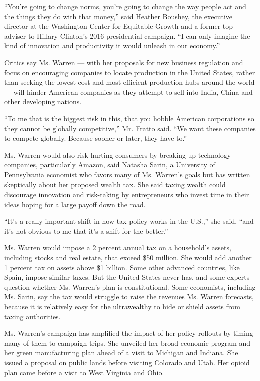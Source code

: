 ``You're going to change norms, you're going to change the way people
act and the things they do with that money,'' said Heather Boushey, the
executive director at the Washington Center for Equitable Growth and a
former top adviser to Hillary Clinton's 2016 presidential campaign. ``I
can only imagine the kind of innovation and productivity it would
unleash in our economy.''

Critics say Ms. Warren --- with her proposals for new business
regulation and focus on encouraging companies to locate production in
the United States, rather than seeking the lowest-cost and most
efficient production hubs around the world --- will hinder American
companies as they attempt to sell into India, China and other developing
nations.

``To me that is the biggest risk in this, that you hobble American
corporations so they cannot be globally competitive,'' Mr. Fratto said.
``We want these companies to compete globally. Because sooner or later,
they have to.''

Ms. Warren would also risk hurting consumers by breaking up technology
companies, particularly Amazon, said Natasha Sarin, a University of
Pennsylvania economist who favors many of Ms. Warren's goals but has
written skeptically about her proposed wealth tax. She said taxing
wealth could discourage innovation and risk-taking by entrepreneurs who
invest time in their ideas hoping for a large payoff down the road.

``It's a really important shift in how tax policy works in the U.S.,''
she said, ``and it's not obvious to me that it's a shift for the
better.''

Ms. Warren would impose a
\href{https://www.nytimes.com/2019/02/18/upshot/warren-wealth-tax.html}{2
percent annual tax on a household's assets}, including stocks and real
estate, that exceed \$50 million. She would add another 1 percent tax on
assets above \$1 billion. Some other advanced countries, like Spain,
impose similar taxes. But the United States never has, and some experts
question whether Ms. Warren's plan is constitutional. Some economists,
including Ms. Sarin, say the tax would struggle to raise the revenues
Ms. Warren forecasts, because it is relatively easy for the ultrawealthy
to hide or shield assets from taxing authorities.

Ms. Warren's campaign has amplified the impact of her policy rollouts by
timing many of them to campaign trips. She unveiled her broad economic
program and her green manufacturing plan ahead of a visit to Michigan
and Indiana. She issued a proposal on public lands before visiting
Colorado and Utah. Her opioid plan came before a visit to West Virginia
and Ohio.

